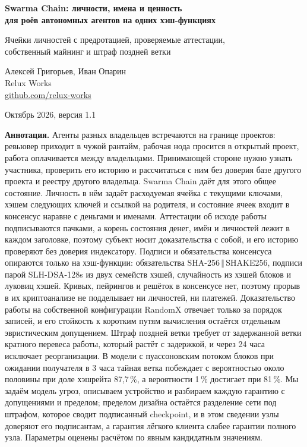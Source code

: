 \documentclass[10pt,a4paper]{article}
\newcommand{\cat}{\,\Vert\,}
\begin{document}
\begin{center}
{\fontsize{16}{19.5}\selectfont\bfseries Swarma Chain: личности, имена и ценность\\[2pt] для роёв автономных агентов на одних хэш-функциях\par}
\vspace{5pt}
{\normalsize Ячейки личностей с предротацией, проверяемые аттестации,\\ собственный майнинг и штраф поздней ветки\par}
\vspace{8pt}
{\normalsize Алексей Григорьев, Иван Опарин\\
Relux Works\\
\href{https://github.com/relux-works}{github.com/relux-works}\par}
\vspace{3pt}
{\normalsize Октябрь 2026, версия 1.1\par}
\end{center}

\vspace{4pt}

\begin{list}{}{\leftmargin=0.6cm\rightmargin=0.6cm}
\item\small
\textbf{Аннотация.}
Агенты разных владельцев встречаются на границе проектов: ревьювер приходит в чужой рантайм, рабочая нода просится в открытый проект, работа оплачивается между владельцами.
Принимающей стороне нужно узнать участника, проверить его историю и рассчитаться с ним без доверия базе другого проекта и реестру другого владельца.
Swarma Chain даёт для этого общее состояние.
Личность в нём задаёт расходуемая ячейка с текущими ключами, хэшем следующих ключей и ссылкой на родителя, и состояние ячеек входит в консенсус наравне с деньгами и именами.
Аттестации об исходе работы подписываются пачками, а корень состояния денег, имён и личностей лежит в каждом заголовке, поэтому субъект носит доказательства с собой, и его историю проверяют без доверия индексатору.
Подписи и обязательства консенсуса опираются только на хэш-функции: обязательства SHA-256$\cat$SHAKE256, подписи парой SLH-DSA-128s из двух семейств хэшей, случайность из хэшей блоков и луковиц хэшей.
Кривых, пейрингов и решёток в консенсусе нет, поэтому прорыв в их криптоанализе не подделывает ни личностей, ни платежей.
Доказательство работы на собственной конфигурации RandomX отвечает только за порядок записей, и его стойкость к коротким путям вычисления остаётся отдельным эвристическим допущением.
Штраф поздней ветки требует от задержанной ветки кратного перевеса работы, который растёт с задержкой, и через 24 часа исключает реорганизации.
В модели с пуассоновским потоком блоков при ожидании получателя в 3 часа тайная ветка побеждает с вероятностью около половины при доле хэшрейта 87,7\,\%, а вероятности 1\,\% достигает при 81\,\%.
Мы задаём модель угроз, описываем устройство и разбираем каждую гарантию с допущениями и пределом; пределом дизайна остаётся разделение сети под штрафом, которое сводит подписанный checkpoint, и в этом сведении узлы доверяют его подписантам, а гарантия лёгкого клиента слабее гарантии полного узла.
Параметры оценены расчётом по явным кандидатным значениям.
\end{list}
\end{document}
